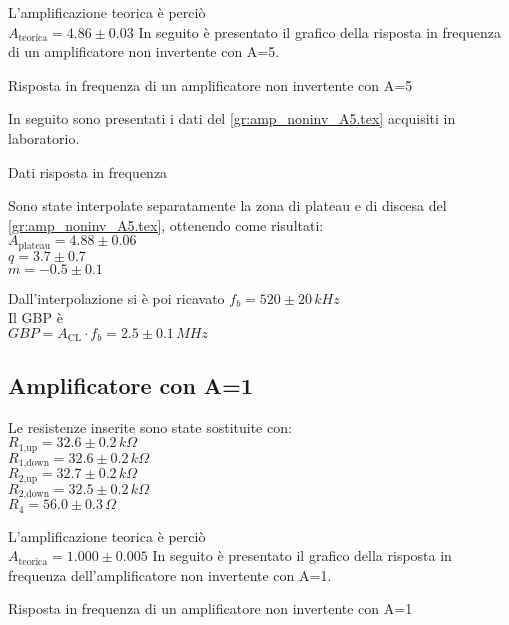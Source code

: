 L'amplificazione teorica è perciò\\
$A_\textrm{teorica} = 4.86 \pm 0.03$
In seguito è presentato il grafico della risposta in frequenza di un amplificatore non invertente con A=5.
\begin{grafico}
 \centering 
  \resizebox{\textwidth}{!}{%
  
  }%
 \caption{Risposta in frequenza di un amplificatore non invertente con A=5} 
 \label{gr:amp_noninv_A5.tex} 
\end{grafico}
In seguito sono presentati i dati del  \autoref{gr:amp_noninv_A5.tex} acquisiti in laboratorio.

\begin{tabella}
 \centering
   
 \caption{Dati risposta in frequenza}
 \label{tab:tab_noninv_A5.tex}
\end{tabella}
Sono state interpolate separatamente la zona di plateau e di discesa del  \autoref{gr:amp_noninv_A5.tex}, ottenendo come risultati:\\
$A_\textrm{plateau}=4.88 \pm 0.06$\\
$q = 3.7 \pm 0.7$\\
$m = -0.5 \pm 0.1$

Dall'interpolazione si è poi ricavato 
$f_b= 520 \pm 20 \,kHz $\\
Il GBP è\\
$GBP=A_\textrm{CL} \cdot f_b = 2.5 \pm 0.1 \,MHz$



\subsection{Amplificatore con A=1}
Le resistenze inserite sono state sostituite con:\\
$R_\textrm{1,up}=32.6 \pm 0.2 \,k\Omega $\\ %
$R_\textrm{1,down}=32.6 \pm 0.2\,k\Omega$\\ %
$R_\textrm{2,up}=32.7 \pm 0.2\,k\Omega$\\ %
$R_\textrm{2,down}=32.5 \pm 0.2\,k\Omega$\\
$R_4=56.0 \pm 0.3\,\Omega$

L'amplificazione teorica è perciò\\
$A_\textrm{teorica} = 1.000 \pm 0.005$
In seguito è presentato il grafico della risposta in frequenza dell'amplificatore non invertente con A=1.

\begin{grafico}
 \centering 
  \resizebox{\textwidth}{!}{%
  
 }%
 \caption{Risposta in frequenza di un amplificatore non invertente con A=1} 
 \label{gr:amp_noninv_A1.tex} 
\end{grafico}

